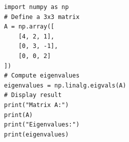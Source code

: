 \begin{verbatim}
import numpy as np
# Define a 3x3 matrix
A = np.array([
    [4, 2, 1],
    [0, 3, -1],
    [0, 0, 2]
])
# Compute eigenvalues
eigenvalues = np.linalg.eigvals(A)
# Display result
print("Matrix A:")
print(A)
print("Eigenvalues:")
print(eigenvalues)
\end{verbatim}